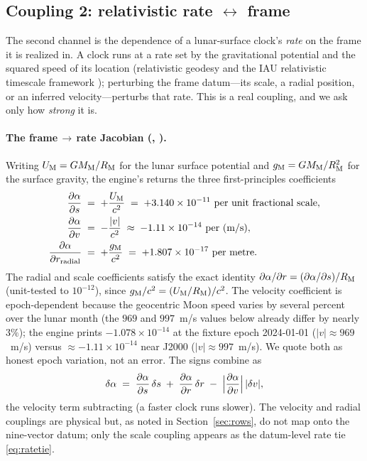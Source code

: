 \subsection{Coupling 2: relativistic rate \texorpdfstring{$\leftrightarrow$}{<->} frame}
\label{sec:coupling2}

The second channel is the dependence of a lunar-surface clock's \emph{rate} on the
frame it is realized in. A clock runs at a rate set by the gravitational potential and the
squared speed of its location (relativistic geodesy and the IAU relativistic timescale
framework \citep{soffel2003iau,mueller2018clocks}); perturbing the frame datum---its scale,
a radial position, or an inferred velocity---perturbs that rate. This is a real coupling,
and we ask only how \emph{strong} it is.

\paragraph{The frame\,$\to$\,rate Jacobian (\Modelled{}, \modtag{}).}
Writing $U_{\mathrm{M}}=GM_{\mathrm{M}}/R_{\mathrm{M}}$ for the lunar surface potential and
$g_{\mathrm{M}}=GM_{\mathrm{M}}/R_{\mathrm{M}}^2$ for the surface gravity, the engine's
 returns the three first-principles coefficients
\begin{align}
  \frac{\partial\alpha}{\partial s}
    &\;=\; +\frac{U_{\mathrm{M}}}{c^2}
    \;=\; +3.140\times10^{-11}\ \text{per unit fractional scale},
    \label{eq:dads}\\
  \frac{\partial\alpha}{\partial v}
    &\;=\; -\frac{|v|}{c^2}
    \;\approx\; -1.11\times10^{-14}\ \text{per (m/s)},
    \label{eq:dadv}\\
  \frac{\partial\alpha}{\partial r_{\mathrm{radial}}}
    &\;=\; +\frac{g_{\mathrm{M}}}{c^2}
    \;=\; +1.807\times10^{-17}\ \text{per metre}.
    \label{eq:dadr}
\end{align}
The radial and scale coefficients satisfy the exact identity
$\partial\alpha/\partial r=(\partial\alpha/\partial s)/R_{\mathrm{M}}$ (unit-tested to
$10^{-12}$), since $g_{\mathrm{M}}/c^2=(U_{\mathrm{M}}/R_{\mathrm{M}})/c^2$. The velocity coefficient is
epoch-dependent because the geocentric Moon speed varies by several percent over the lunar
month (the $969$ and $997$~m/s values below already differ by nearly $3\%$); the engine
prints $-1.078\times10^{-14}$ at the fixture epoch 2024-01-01
($|v|\approx969$~m/s) versus $\approx-1.11\times10^{-14}$ near J2000
($|v|\approx997$~m/s). We quote both as honest epoch variation, not an error. The signs
combine as
\begin{equation}
  \delta\alpha
  \;=\; \frac{\partial\alpha}{\partial s}\,\delta s
  \;+\; \frac{\partial\alpha}{\partial r}\,\delta r
  \;-\; \Bigl|\frac{\partial\alpha}{\partial v}\Bigr|\,|\delta v|,
  \label{eq:dalphacombine}
\end{equation}
the velocity term subtracting (a faster clock runs slower). The velocity and radial
couplings are physical but, as noted in Section~\ref{sec:rows}, do not map onto the
nine-vector datum; only the scale coupling appears as the datum-level rate tie
\eqref{eq:ratetie}.


